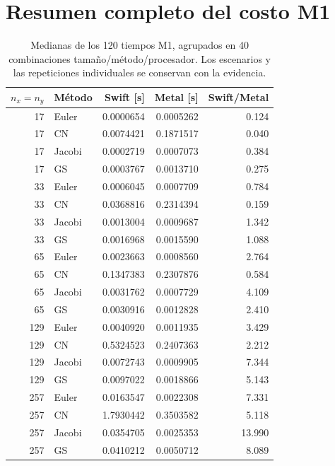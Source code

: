 \documentclass[11pt,a4paper]{article}
\begin{document}
\section{Resumen completo del costo M1}
\begin{table}[H]\centering\small
\caption{Medianas de los 120 tiempos M1, agrupados en 40 combinaciones tamaño/método/procesador. Los escenarios y las repeticiones individuales se conservan con la evidencia.}\label{tab:full-cost}
\begin{tabular}{@{}rlrrr@{}}\toprule
$n_x=n_y$ & Método & Swift [s] & Metal [s] & Swift/Metal\\\midrule
17 & Euler & 0.0000654 & 0.0005262 & 0.124\\
17 & CN & 0.0074421 & 0.1871517 & 0.040\\
17 & Jacobi & 0.0002719 & 0.0007073 & 0.384\\
17 & GS & 0.0003767 & 0.0013710 & 0.275\\
33 & Euler & 0.0006045 & 0.0007709 & 0.784\\
33 & CN & 0.0368816 & 0.2314394 & 0.159\\
33 & Jacobi & 0.0013004 & 0.0009687 & 1.342\\
33 & GS & 0.0016968 & 0.0015590 & 1.088\\
65 & Euler & 0.0023663 & 0.0008560 & 2.764\\
65 & CN & 0.1347383 & 0.2307876 & 0.584\\
65 & Jacobi & 0.0031762 & 0.0007729 & 4.109\\
65 & GS & 0.0030916 & 0.0012828 & 2.410\\
129 & Euler & 0.0040920 & 0.0011935 & 3.429\\
129 & CN & 0.5324523 & 0.2407363 & 2.212\\
129 & Jacobi & 0.0072743 & 0.0009905 & 7.344\\
129 & GS & 0.0097022 & 0.0018866 & 5.143\\
257 & Euler & 0.0163547 & 0.0022308 & 7.331\\
257 & CN & 1.7930442 & 0.3503582 & 5.118\\
257 & Jacobi & 0.0354705 & 0.0025353 & 13.990\\
257 & GS & 0.0410212 & 0.0050712 & 8.089\\
\bottomrule\end{tabular}\end{table}
\end{document}
